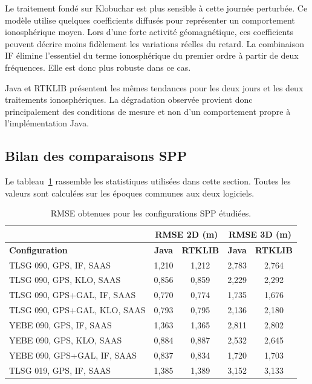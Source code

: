 Le traitement fondé sur Klobuchar est plus sensible à cette journée perturbée.
Ce modèle utilise quelques coefficients diffusés pour représenter un
comportement ionosphérique moyen. Lors d'une forte activité géomagnétique, ces
coefficients peuvent décrire moins fidèlement les variations réelles du retard.
La combinaison IF élimine l'essentiel du terme ionosphérique du
premier ordre à partir de deux fréquences. Elle est donc plus robuste dans ce
cas.

Java et RTKLIB présentent les mêmes tendances pour les deux jours et les deux
traitements ionosphériques. La dégradation observée provient donc principalement
des conditions de mesure et non d'un comportement propre à l'implémentation
Java.

\subsection{Bilan des comparaisons SPP}

Le tableau~\ref{tab:spp_validation_rmse} rassemble les statistiques utilisées
dans cette section. Toutes les valeurs sont calculées sur les époques communes
aux deux logiciels.

\begin{table}[H]
\centering
\small
\setlength{\tabcolsep}{4pt}
\begin{tabular}{|l|c|c|c|c|}
\hline
\multicolumn{1}{|c|}{} & \multicolumn{2}{c|}{\textbf{RMSE 2D (m)}} &
  \multicolumn{2}{c|}{\textbf{RMSE 3D (m)}} \\
\hline
\textbf{Configuration} & \textbf{Java} & \textbf{RTKLIB} &
\textbf{Java} & \textbf{RTKLIB} \\
\hline
TLSG 090, GPS, IF, SAAS          & 1,210 & 1,212 & 2,783 & 2,764 \\
\hline
TLSG 090, GPS, KLO, SAAS         & 0,856 & 0,859 & 2,229 & 2,292 \\
\hline
TLSG 090, GPS+GAL, IF, SAAS      & 0,770 & 0,774 & 1,735 & 1,676 \\
\hline
TLSG 090, GPS+GAL, KLO, SAAS     & 0,793 & 0,795 & 2,136 & 2,180 \\
\hline
YEBE 090, GPS, IF, SAAS          & 1,363 & 1,365 & 2,811 & 2,802 \\
\hline
YEBE 090, GPS, KLO, SAAS         & 0,884 & 0,887 & 2,532 & 2,645 \\
\hline
YEBE 090, GPS+GAL, IF, SAAS      & 0,837 & 0,834 & 1,720 & 1,703 \\
\hline
TLSG 019, GPS, IF, SAAS          & 1,385 & 1,389 & 3,152 & 3,133 \\
\hline
\end{tabular}
\caption{RMSE obtenues pour les configurations SPP étudiées.}
\label{tab:spp_validation_rmse}
\end{table}

